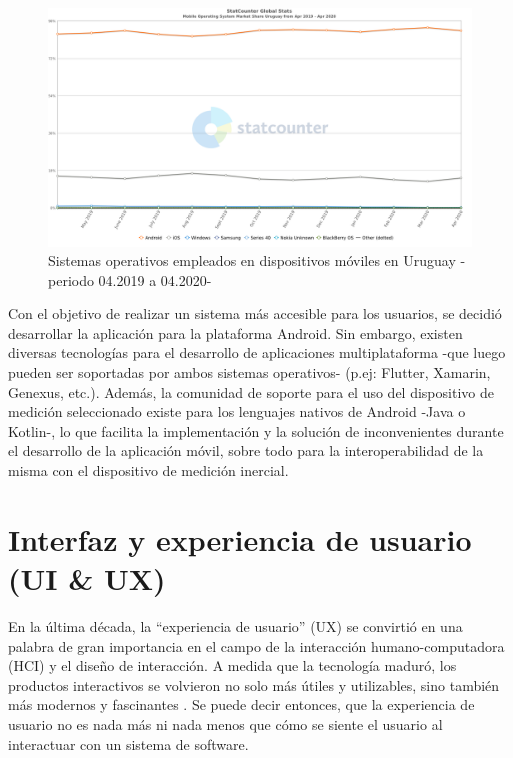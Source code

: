 \begin{figure}[H]
\includegraphics[width=\textwidth]{TESIS/imagenes/chap04/StatCounter-os_combined-UY-monthly-201904-202004.png}
\caption{ Sistemas operativos empleados en dispositivos móviles en Uruguay -periodo 04.2019 a 04.2020- \cite{StatCounter} }
\label{fig:uy-mobile-so}
\end{figure}

Con el objetivo de realizar un sistema más accesible para los usuarios, se decidió desarrollar la aplicación para la plataforma Android. Sin embargo, existen diversas tecnologías para el desarrollo de aplicaciones multiplataforma -que luego pueden ser soportadas por ambos sistemas operativos- (p.ej: Flutter, Xamarin, Genexus, etc.). Además, la comunidad de soporte para el uso del dispositivo de medición seleccionado existe para los lenguajes nativos de Android -Java o Kotlin-, lo que facilita la implementación y la solución de inconvenientes durante el desarrollo de la aplicación móvil, sobre todo para la interoperabilidad de la misma con el dispositivo de medición inercial.  

\section{Interfaz y experiencia de usuario (UI \& UX)}

En la última década, la ``experiencia de usuario'' (UX) se convirtió en una palabra de gran importancia en el campo de la interacción humano-computadora (HCI) y el diseño de interacción. A medida que la tecnología maduró, los productos interactivos se volvieron no solo más útiles y utilizables, sino también más modernos y fascinantes \cite{Hassenzahl2006}. Se puede decir entonces, que la experiencia de usuario no es nada más ni nada menos que cómo se siente el usuario al interactuar con un sistema de software. 

